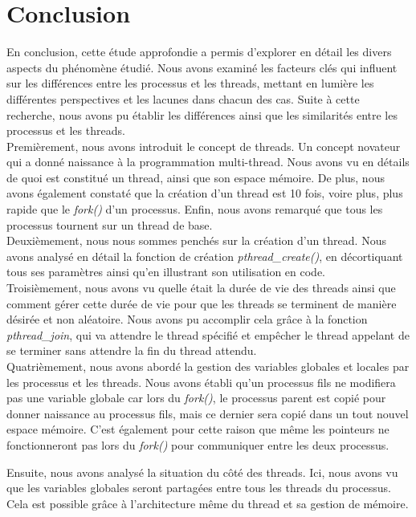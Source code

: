 \section{Conclusion}

En conclusion, cette étude approfondie a permis d'explorer en détail les divers aspects du phénomène étudié. Nous avons examiné les facteurs clés qui influent sur les différences entre les processus et les threads, mettant en lumière les différentes perspectives et les lacunes dans chacun des cas. Suite à cette recherche, nous avons pu établir les différences ainsi que les similarités entre les processus et les threads.
\\

Premièrement, nous avons introduit le concept de threads. Un concept novateur qui a donné naissance à la programmation multi-thread. Nous avons vu en détails de quoi est constitué un thread, ainsi que son espace mémoire. De plus, nous avons également constaté que la création d'un thread est 10 fois, voire plus, plus rapide que le \textit{fork()} d'un processus. Enfin, nous avons remarqué que tous les processus tournent sur un thread de base.
\\

Deuxièmement, nous nous sommes penchés sur la création d'un thread. Nous avons analysé en détail la fonction de création \textit{pthread\_create()}, en décortiquant tous ses paramètres ainsi qu'en illustrant son utilisation en code.
\\

Troisièmement, nous avons vu quelle était la durée de vie des threads ainsi que comment gérer cette durée de vie pour que les threads se terminent de manière désirée et non aléatoire. Nous avons pu accomplir cela grâce à la fonction \textit{pthread\_join}, qui va attendre le thread spécifié et empêcher le thread appelant de se terminer sans attendre la fin du thread attendu.
\\

Quatrièmement, nous avons abordé la gestion des variables globales et locales par les processus et les threads. Nous avons établi qu'un processus fils ne modifiera pas une variable globale car lors du \textit{fork()}, le processus parent est copié pour donner naissance au processus fils, mais ce dernier sera copié dans un tout nouvel espace mémoire. C'est également pour cette raison que même les pointeurs ne fonctionneront pas lors du \textit{fork()} pour communiquer entre les deux processus.

Ensuite, nous avons analysé la situation du côté des threads. Ici, nous avons vu que les variables globales seront partagées entre tous les threads du processus. Cela est possible grâce à l'architecture même du thread et sa gestion de mémoire.

